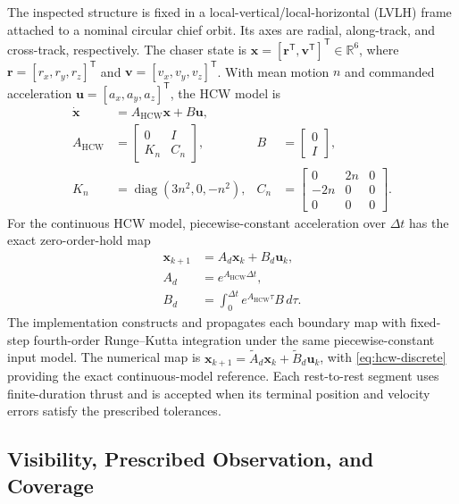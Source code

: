 \documentclass{IEEEtaes}
\newcommand{\R}{\mathbb{R}}
\newcommand{\dt}{\Delta t}
\theoremstyle{remark}
\theoremstyle{plain}
\begin{document}
The inspected structure is fixed in a local-vertical/local-horizontal (LVLH) frame attached to a nominal circular chief orbit. Its axes are radial, along-track, and cross-track, respectively. The chaser state is $\mathbf{x}=[\mathbf{r}^{\mathsf T},\mathbf{v}^{\mathsf T}]^{\mathsf T}\in\R^6$, where $\mathbf r=[r_x,r_y,r_z]^{\mathsf T}$ and $\mathbf v=[v_x,v_y,v_z]^{\mathsf T}$. With mean motion $n$ and commanded acceleration $\mathbf{u}=[a_x,a_y,a_z]^{\mathsf T}$, the HCW model is
\begin{equation}
  \begin{aligned}
  \dot{\mathbf{x}}&=A_{\mathrm{HCW}}\mathbf{x}+B\mathbf{u},\\
  A_{\mathrm{HCW}}&=\begin{bmatrix}0&I\\K_n&C_n\end{bmatrix},
  &B&=\begin{bmatrix}0\\I\end{bmatrix},\\
  K_n&=\operatorname{diag}(3n^2,0,-n^2),
  &C_n&=\begin{bmatrix}0&2n&0\\-2n&0&0\\0&0&0\end{bmatrix}.
  \end{aligned}
  \label{eq:hcw-continuous}
\end{equation}
For the continuous HCW model, piecewise-constant acceleration over $\dt$ has the exact zero-order-hold map
\begin{equation}
  \begin{aligned}
  \mathbf{x}_{k+1}&=A_d\mathbf{x}_k+B_d\mathbf{u}_k,\\
  A_d&=e^{A_{\mathrm{HCW}}\dt},\\
  B_d&=\int_0^{\dt}e^{A_{\mathrm{HCW}}\tau}B\,d\tau.
  \end{aligned}
  \label{eq:hcw-discrete}
\end{equation}
The implementation constructs and propagates each boundary map with fixed-step fourth-order Runge--Kutta integration under the same piecewise-constant input model. The numerical map is $\mathbf x_{k+1}=\widetilde A_d\mathbf x_k+\widetilde B_d\mathbf u_k$, with \eqref{eq:hcw-discrete} providing the exact continuous-model reference. Each rest-to-rest segment uses finite-duration thrust and is accepted when its terminal position and velocity errors satisfy the prescribed tolerances.

\subsection{Visibility, Prescribed Observation, and Coverage}
\end{document}
